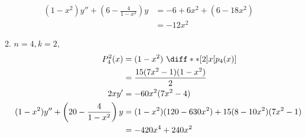 \begin{enumerate}
\begin{enumerate}
\begin{align}
                        (1 - x^2)y'' + \left(6 - \frac{4}{1-x^2} \right)y
                                  & = -6 + 6x^2 + (6 - 18x^2)         \\
                                  & = -12x^2
                    \end{align}
              \item $ n = 4, k = 2 $,
                    \begin{align}
                        P_4^2 (x) & = (1 - x^2)\ \diff**[2]{x}{\left[
                        p_4(x) \right]}                               \\
                                  & = \frac{15(7x^2 - 1)(1 - x^2)}{2} \\
                        2xy'      & = -60x^2(7x^2 - 4)                \\
                        (1 - x^2)y'' + \left(20 - \frac{4}{1-x^2} \right)y
                                  & = (1-x^2)(120 - 630x^2)
                        + 15(8 - 10x^2)(7x^2 - 1)                     \\
                                  & = -420x^4 + 240x^2
                    \end{align}
          \end{enumerate}
\end{enumerate}